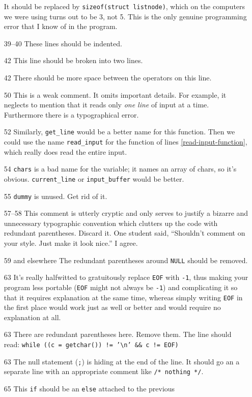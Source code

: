 \begin{itemize}
It should be replaced by {\tt sizeof(struct listnode)}, which on the
computers we were using turns out to be 3, not 5.  This is the only
genuine programming error that I know of in the program.
\item[39--40] These lines should be indented.
\item[42] This line should be broken into two lines.
\item[42] There should be more space between the operators on this line.
\item[50] This is a weak comment.  It omits important details.  For
example, it neglects to mention that it reads only {\em one line}\/ of
input at a time.  Furthermore there is a typographical error.
\item[52] Similarly, {\tt get\_line} would be a better name for this
function.  Then we could use the name {\tt read\_input} for the function
of lines \ref{read-input-function}, which really does read the entire
input. 
\item[54] {\tt chars} is a bad name for the variable; it names an array
of chars, so it's obvious.  {\tt current\_line} or {\tt input\_buffer}
would be better.
\item[55] {\tt dummy} is unused.  Get rid of it.
\item[57--58] This comment is utterly cryptic and only serves to justify
a bizarre and unnecessary typographic convention which clutters up the
code with redundant parentheses.  Discard it.  One student said,
``Shouldn't comment on your style. Just make it look nice.'' I agree.
\item[59 and elsewhere] The redundant parentheses around {\tt NULL}
should be removed. 
\item[63] It's really halfwitted to gratuitously replace {\tt EOF} with
{\tt -1}, thus making your program less portable ({\tt EOF} might not
always be {\tt -1}) and complicating it so that it requires explanation
at the same time, whereas simply writing {\tt EOF} in the first place
would work just as well or better and would require no explanation at
all.
\item[63] There are redundant parentheses here.  Remove them.  The line
should read:  {\tt while ((c = getchar()) != '\verb+\+n' \&\& c != EOF)}
\item[63] The null statement ({\tt ;}) is hiding at the end of the line.
It should go an a separate line with an appropriate comment like {\tt /*
nothing */}. 
\item[65] This {\tt if} should be an {\tt else} attached to the previous

\end{itemize}

